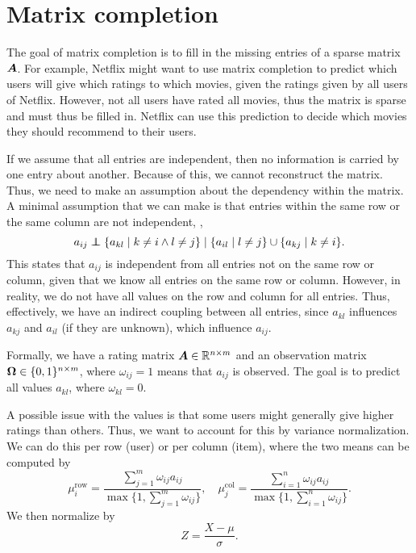 \section{Matrix completion}

The goal of matrix completion is to fill in the missing entries of a sparse matrix $\bm{A}$. For
example, Netflix might want to use matrix completion to predict which users will give which ratings
to which movies, given the ratings given by all users of Netflix. However, not all users have rated
all movies, thus the matrix is sparse and must thus be filled in. Netflix can use this prediction
to decide which movies they should recommend to their users.

If we assume that all entries are independent, then no information is carried by one entry about
another. Because of this, we cannot reconstruct the matrix. Thus, we need to make an assumption
about the dependency within the matrix. A minimal assumption that we can make is that entries
within the same row or the same column are not independent, \ie, \[
    a_{ij} \mathrel{\perp\!\!\!\!\perp} \{ a_{kl} \mid k \neq i \land l \neq j \} \mid \{ a_{il} \mid l \neq j \} \cup \{ a_{kj} \mid k \neq i \}.
\]
This states that $a_{ij}$ is independent from all entries not on the same row or column, given that
we know all entries on the same row or column. However, in reality, we do not have all values on
the row and column for all entries. Thus, effectively, we have an indirect coupling between all
entries, since $a_{kl}$ influences $a_{kj}$ and $a_{il}$ (if they are unknown), which influence
$a_{ij}$.

Formally, we have a rating matrix $\bm{A} \in \mathbb{R}^{n \times m}$ and an observation matrix
$\bm{\Omega} \in \{ 0,1 \}^{n\times m}$, where $\omega_{ij}=1$ means that $a_{ij}$ is observed.
The goal is to predict all values $a_{kl}$, where $\omega_{kl}=0$.

A possible issue with the values is that some users might generally give higher ratings than
others. Thus, we want to account for this by
variance normalization. We can do this per row (user) or per column (item), where the two means can
be computed by \[
    \mu_i^{\mathrm{row}} = \frac{\sum_{j=1}^{m} \omega_{ij} a_{ij}}{\max \{ 1, \sum_{j=1}^{m} \omega_{ij} \}}, \quad \mu_j^{\mathrm{col}} = \frac{\sum_{i=1}^{n} \omega_{ij} a_{ij}}{\max \{ 1, \sum_{i=1}^{n} \omega_{ij} \}}.
\]
We then normalize by \[
    Z = \frac{X - \mu}{\sigma}.
\]

